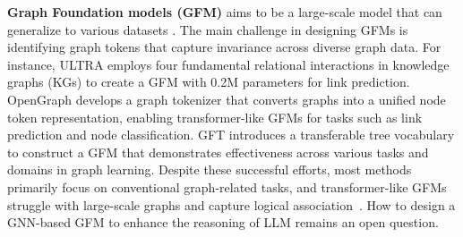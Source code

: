 \noindent\textbf{Graph Foundation models (GFM)} aims to be a large-scale model that can generalize to various datasets \citep{maoposition,liu2025graph}. The main challenge in designing GFMs is identifying graph tokens that capture invariance across diverse graph data. For instance, ULTRA \citep{galkintowards} employs four fundamental relational interactions in knowledge graphs (KGs) to create a GFM with 0.2M parameters for link prediction. OpenGraph \citep{xia2024opengraph} develops a graph tokenizer that converts graphs into a unified node token representation, enabling transformer-like GFMs for tasks such as link prediction and node classification. GFT \citep{wang2024gft} introduces a transferable tree vocabulary to construct a GFM that demonstrates effectiveness across various tasks and domains in graph learning. Despite these successful efforts, most methods primarily focus on conventional graph-related tasks, and transformer-like GFMs \citep{tang2024higpt,tang2024graphgpt} struggle with large-scale graphs and capture logical association~\citep{qiuunderstanding}. How to design a GNN-based GFM to enhance the reasoning of LLM remains an open question.

